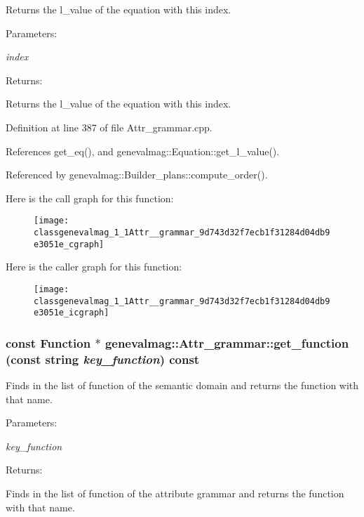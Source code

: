 Returns the l\_\-value of the equation with this index. \begin{Desc}
\item[Parameters:]
\begin{description}
\item[{\em index}]\end{description}
\end{Desc}
\begin{Desc}
\item[Returns:]\end{Desc}
Returns the l\_\-value of the equation with this index. 

Definition at line 387 of file Attr\_\-grammar.cpp.

References get\_\-eq(), and genevalmag::Equation::get\_\-l\_\-value().

Referenced by genevalmag::Builder\_\-plans::compute\_\-order().

Here is the call graph for this function:\nopagebreak
\begin{figure}[H]
\begin{center}
\leavevmode
\texttt{[image: classgenevalmag\_1\_1Attr\_\_grammar\_9d743d32f7ecb1f31284d04db9e3051e\_cgraph]}
\end{center}
\end{figure}


Here is the caller graph for this function:\nopagebreak
\begin{figure}[H]
\begin{center}
\leavevmode
\texttt{[image: classgenevalmag\_1\_1Attr\_\_grammar\_9d743d32f7ecb1f31284d04db9e3051e\_icgraph]}
\end{center}
\end{figure}
\hypertarget{classgenevalmag_1_1Attr__grammar_e1070b6d532da48fb2d87c40c76cf341}{
\subsubsection[{get\_\-function}]{\setlength{\rightskip}{0pt plus 5cm}const {\bf Function} $\ast$ genevalmag::Attr\_\-grammar::get\_\-function (const string {\em key\_\-function}) const}}
\label{classgenevalmag_1_1Attr__grammar_e1070b6d532da48fb2d87c40c76cf341}


Finds in the list of function of the semantic domain and returns the function with that name. \begin{Desc}
\item[Parameters:]
\begin{description}
\item[{\em key\_\-function}]\end{description}
\end{Desc}
\begin{Desc}
\item[Returns:]\end{Desc}
Finds in the list of function of the attribute grammar and returns the function with that name. 

